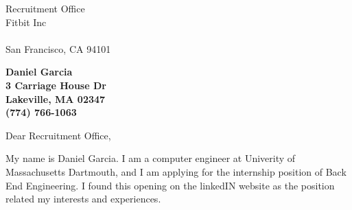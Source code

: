 \documentclass[11pt]{letter} %
\begin{document}

\begin{letter}{Recruitment Office\\
Fitbit Inc\\ \\
San Francisco, CA 94101} 


\begin{center}
\large\bf Daniel Garcia \\ %
3 Carriage House Dr \\ Lakeville, MA 02347 \\ (774) 766-1063 %
\end{center} 
\vfill

\signature{Daniel Garcia} %


\opening{Dear Recruitment Office,} 
 
My name is Daniel Garcia. I am a computer engineer at Univerity of Massachusetts Dartmouth, and I am applying for the internship position of Back End Engineering. I found this opening on the linkedIN website as the position related my interests and experiences. 


\end{letter}
\end{document}
